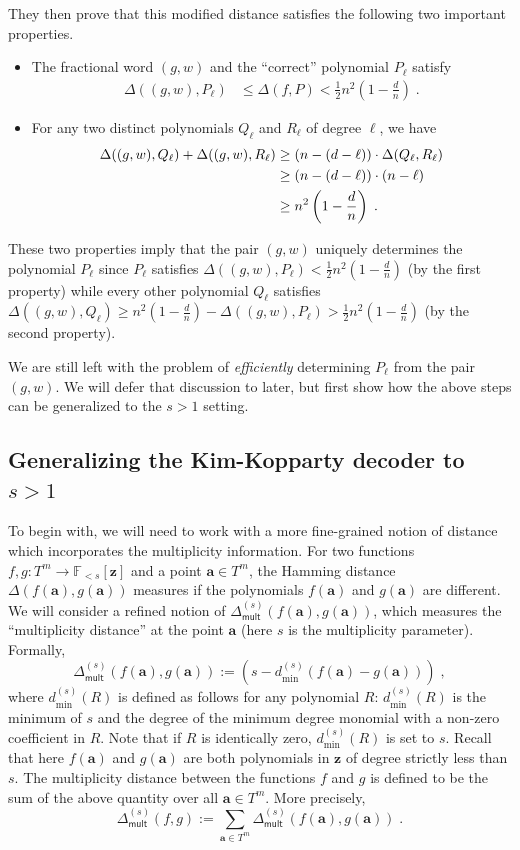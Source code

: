 \documentclass{theoretics}
\def\Field{\mathbb{F}}
\let\F\Field
\def\veca{\mathbf{a}}
\def\vecz{\mathbf{z}}
\newcommand{\vz}{\vecz}
\newcommand{\va}{\veca}
\begin{document}
	They then prove that this modified distance satisfies the following
	two important properties.
	\begin{itemize}
		\item The fractional word $(g,w)$ and the ``correct'' polynomial
		$P_\ell$ satisfy
		\begin{align}\Delta((g,w),P_\ell) &\leq \Delta(f,P) < \frac12
			n^2\left(1-\frac{d}{n}\right)\;.\label{eq:KKprop1}
		\end{align}
		\item For any two distinct polynomials $Q_\ell$ and $R_\ell$ of
		degree $\ell$, we have
		\begin{align}
			\Delta((g,w), Q_\ell) + \Delta((g,w),R_\ell) &\geq
			(n-(d-\ell))\cdot \Delta(Q_\ell,R_\ell)\notag\\
			&\geq
			(n-(d-\ell))
			\cdot
			(n-\ell)\notag\\
			&\geq n^2\left(1
			-\frac{d}{n}\right)\;. \label{eq:KKprop2}
		\end{align}
	\end{itemize}
	These two properties imply that the pair $(g,w)$ uniquely determines
	the polynomial $P_\ell$ since $P_\ell$ satisfies
	$\Delta((g,w),P_\ell) <  \frac12
	n^2\left(1-\frac{d}{n}\right)$ (by the first property) while  every other polynomial $Q_\ell$
	satisfies $\Delta((g,w), Q_\ell) \geq n^2\left(1
	-\frac{d}{n}\right) - \Delta((g,w),P_\ell) > \frac12
	n^2\left(1-\frac{d}{n}\right)$ (by the second property).
	
	We are still left with the problem
	of \emph{efficiently} determining $P_\ell$ from the pair $(g,w)$. We will
	defer that discussion to later, but first show how the above steps
	can be generalized to the $s>1$ setting. 
	
	\subsection{Generalizing the Kim-Kopparty decoder to \texorpdfstring{$s>1$}{s > 1}}
	To begin with, we will need to work with a more fine-grained notion of
	distance which incorporates the multiplicity information. For two
	functions $f, g \colon T^m \to \F_{<s}[\vz]$ and a point $\va \in
	T^m$, the Hamming distance $\Delta(f(\va), g(\va))$ measures if the polynomials $f(\va)$ and
	$g(\va)$ are different. We will consider a refined notion of $\Delta_{\mathsf{mult}}^{(s)}(f(\va),g(\va))$, which measures the
	``multiplicity distance'' at the point $\va$ (here $s$ is the
	multiplicity parameter). Formally, 
	\[ \Delta_{\mathsf{mult}}^{(s)}(f(\va),g(\va)) := (s -
	d^{(s)}_{\min}(f(\va) - g(\va)))\;,\]
	where $d^{(s)}_{\min}(R)$ is defined as follows for any polynomial
	$R$: $d^{(s)}_{\min}(R)$ is the minimum of $s$ and the degree of the
	minimum degree monomial with a non-zero coefficient in $R$. Note that if $R$ is
	identically zero, $d^{(s)}_{\min}(R)$ is set to $s$. Recall that here $f(\va)$ and $g(\va)
	$ are both polynomials in $\vz$ of degree strictly less than $s$. The multiplicity distance between the functions $f$ and $g$ is defined
	to be the sum of the above quantity over all $\va \in T^m$. More
	precisely,
	\[ \Delta_{\mathsf{mult}}^{(s)}(f,g) := \sum_{\va \in T^m}
	\Delta_{\mathsf{mult}}^{(s)}(f(\va),g(\va))\;.
	\]
	
\end{document}
